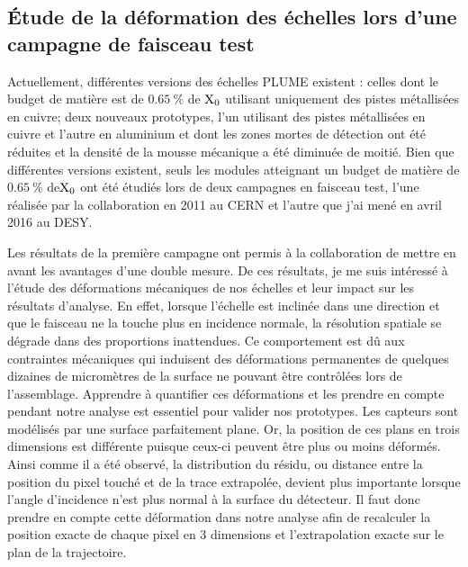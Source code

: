     \subsection{Étude de la déformation des échelles lors d'une campagne de faisceau test}

  Actuellement, différentes versions des échelles PLUME existent : celles dont le budget de matière est de $0.65~\%$ de $\rm{X_0}$ utilisant uniquement des pistes métallisées en cuivre; deux nouveaux prototypes, l'un utilisant des pistes métallisées en cuivre et l'autre en aluminium et dont les zones mortes de détection ont été réduites et la densité de la mousse mécanique a été diminuée de moitié.
  Bien que différentes versions existent, seuls les modules atteignant un budget de matière de $0.65~\%$ de$ \rm{X_0}$ ont été étudiés lors de deux campagnes en faisceau test, l'une réalisée par la collaboration en 2011 au CERN et l'autre que j'ai mené en avril 2016 au DESY.

  Les résultats de la première campagne ont permis à la collaboration de mettre en avant les avantages d'une double mesure. 
  De ces résultats, je me suis intéressé à l'étude des déformations mécaniques de nos échelles et leur impact sur les résultats d'analyse.
  En effet, lorsque l'échelle est inclinée dans une direction et que le faisceau ne la touche plus en incidence normale, la résolution spatiale se dégrade dans des proportions inattendues.
  Ce comportement est dû aux contraintes mécaniques qui induisent des déformations permanentes de quelques dizaines de micromètres de la surface ne pouvant être contrôlées lors de l'assemblage.
  Apprendre à quantifier ces déformations et les prendre en compte pendant notre analyse est essentiel pour valider nos prototypes.
  Les capteurs sont modélisés par une surface parfaitement plane.
  Or, la position de ces plans en trois dimensions est différente puisque ceux-ci peuvent être plus ou moins déformés.
  Ainsi comme il a été observé, la distribution du résidu, ou distance entre la position du pixel touché et de la trace extrapolée, devient plus importante lorsque l'angle d'incidence n'est plus normal à la surface du détecteur.
  Il faut donc prendre en compte cette déformation dans notre analyse afin de recalculer la position exacte de chaque pixel en 3 dimensions et l'extrapolation exacte sur le plan de la trajectoire. 
  

